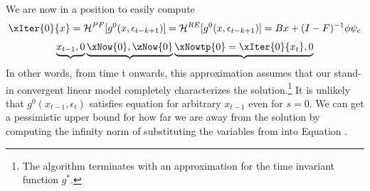 \documentclass[12pt]{article}
\begin{document}
We are now in a position to easily compute 
 \begin{gather}
\xIter{0}{x}=\mathcal{H}^{PF}[g^{0}(x,\epsilon_{t-k+1})]=
\mathcal{H}^{RE}[g^{0}(x,\epsilon_{t-k+1})]= 
B x+  (I - F)^{-1} \phi \psi_c
 \end{gather}
\begin{gather}
\underbrace{x_{t-1},0} 
\underbrace{\xNow{0},\zNow{0}}
\underbrace{\xNowtp{0}=\xIter{0}{x_{t}},0}
\end{gather}
In other words, from time t onwards, this approximation assumes 
that our stand-in
 convergent linear model completely characterizes the solution.\footnote{
The algorithm terminates with an approximation for 
the time invariant function $g^\ast$.}  It is unlikely that $g^0(x_{t-1},\epsilon_{t})$
satisfies equation  for arbitrary $x_{t-1}$ even for $s=0$.
We can get a pessimistic upper bound for how far we are away from the solution 
by computing the infinity norm of substituting the variables from into Equation .
\end{document}
